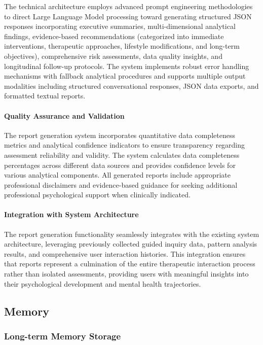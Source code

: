 The technical architecture employs advanced prompt engineering methodologies to direct Large Language Model processing toward generating structured JSON responses incorporating executive summaries, multi-dimensional analytical findings, evidence-based recommendations (categorized into immediate interventions, therapeutic approaches, lifestyle modifications, and long-term objectives), comprehensive risk assessments, data quality insights, and longitudinal follow-up protocols. The system implements robust error handling mechanisms with fallback analytical procedures and supports multiple output modalities including structured conversational responses, JSON data exports, and formatted textual reports.

\paragraph{Quality Assurance and Validation}

The report generation system incorporates quantitative data completeness metrics and analytical confidence indicators to ensure transparency regarding assessment reliability and validity. The system calculates data completeness percentages across different data sources and provides confidence levels for various analytical components. All generated reports include appropriate professional disclaimers and evidence-based guidance for seeking additional professional psychological support when clinically indicated.

\paragraph{Integration with System Architecture}

The report generation functionality seamlessly integrates with the existing system architecture, leveraging previously collected guided inquiry data, pattern analysis results, and comprehensive user interaction histories. This integration ensures that reports represent a culmination of the entire therapeutic interaction process rather than isolated assessments, providing users with meaningful insights into their psychological development and mental health trajectories.

\subsection{Memory}

\subsubsection{Long-term Memory Storage}

